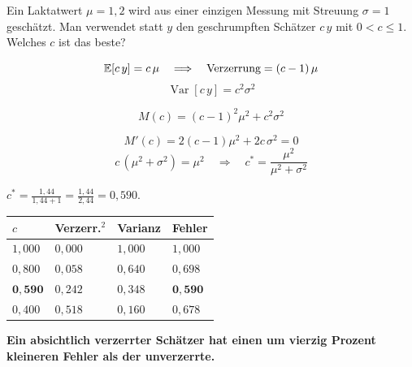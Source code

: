 \begin{aufgabe}
Ein Laktatwert $\mu = 1{,}2$ wird aus einer einzigen Messung mit Streuung $\sigma = 1$ geschätzt. Man verwendet statt $y$ den geschrumpften Schätzer $c\,y$ mit $0 < c \le 1$. Welches $c$ ist das beste?

\loesung
{}
\[ \mathbb{E}[c\,y] = c\,\mu \quad\Longrightarrow\quad \text{Verzerrung} = (c-1)\,\mu \]
\[ \operatorname{Var}[c\,y] = c^{2}\sigma^{2} \]

\[ M(c) = (c-1)^{2}\mu^{2} + c^{2}\sigma^{2} \]

\[ M'(c) = 2(c-1)\mu^{2} + 2c\,\sigma^{2} = 0 \]
\[ c\,(\mu^{2}+\sigma^{2}) = \mu^{2} \quad\Longrightarrow\quad c^{*} = \frac{\mu^{2}}{\mu^{2}+\sigma^{2}} \]

 $c^{*} = \frac{1{,}44}{1{,}44+1} = \frac{1{,}44}{2{,}44} = 0{,}590$.

\begin{center}
{\small
\renewcommand{\arraystretch}{1.48}
\begin{tabular}{@{}P{1.6cm}P{2.0cm}P{1.8cm}P{1.8cm}@{}}
\toprule
$c$ & \textbf{Verzerr.$^{2}$} & \textbf{Varianz} & \textbf{Fehler}\\
\midrule
$1{,}000$ & $0{,}000$ & $1{,}000$ & $1{,}000$\\
$0{,}800$ & $0{,}058$ & $0{,}640$ & $0{,}698$\\
$\mathbf{0{,}590}$ & $0{,}242$ & $0{,}348$ & $\mathbf{0{,}590}$\\
$0{,}400$ & $0{,}518$ & $0{,}160$ & $0{,}678$\\
\bottomrule
\end{tabular}}
\end{center}

\begin{center}
\begin{minipage}{0.9\textwidth}
\textbf{Ein absichtlich verzerrter Schätzer hat einen um vierzig Prozent kleineren Fehler als der unverzerrte.}
\end{minipage}
\end{center}

\begin{center}
\begin{minipage}{0.88\textwidth}
\end{minipage}
\end{center}


\end{aufgabe}
